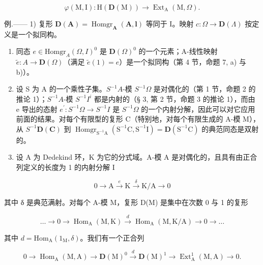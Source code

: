 \[
\varphi (\mathrm{M}, \mathrm{I}): \mathrm{H} (\mathbf {D} (\mathrm{M})) \longrightarrow \operatorname{Ext} _ {\mathrm{A}} (\mathrm{M}, \Omega).
\]

例.—— 1) 复形 \(\mathbf{D}(\mathbf{A}) = \operatorname{Homgr}_{\mathbf{A}}(\mathbf{A},\mathbf{l})\) 等同于 I。映射 \(c:\Omega \to \mathbf{D}(\Lambda)\) 按定义是一个拟同构。

\begin{enumerate}
\def\labelenumi{\arabic{enumi})}
\setcounter{enumi}{1}
\item
  同态 \(e \in \text{Homgr}_A(\Omega, I)^0\) 是 \(\mathbf{D}(\Omega)^0\) 的一个元素；A-线性映射 \(\tilde{e}: A \to \mathbf{D}(\Omega)\)（满足 \(\tilde{e}(1) = e\)）是一个拟同构（第 4 节，命题 7, a) 与 b)）。
\item
  设 S 为 A 的一个乘性子集。\(S^{-1}A\)-模 \(S^{-1}\Omega\) 是对偶化的（第 1 节，命题 2 的推论 1）；\(S^{-1}A\)-模 \(S^{-1}I^{i}\) 都是内射的（§ 3, 第 2 节，命题 3 的推论 1），而由 e 导出的态射 \(e^{\prime}:S^{-1}\Omega\to S^{-1}I\) 是 \(S^{-1}\Omega\) 的一个内射分解，因此可以对它应用前面的结果。对每个有限型的复形 C（特别地，对每个有限生成的 A-模 M），从 \(S^{-1}\mathbf{D}(\mathbf{C})\) 到 \(\operatorname{Homgr}_{\mathrm{S}^{-1}\mathrm{A}}(\mathrm{S}^{-1}\mathrm{C},\mathrm{S}^{-1}\mathrm{I})=\mathbf{D}(\mathrm{S}^{-1}\mathrm{C})\) 的典范同态是双射的。
\item
  设 A 为 Dedekind 环，K 为它的分式域。A-模 A 是对偶化的，且具有由正合列定义的长度为 1 的内射分解 I
\end{enumerate}

\[
0 \to \mathrm{A} \stackrel {e} {\longrightarrow} \mathrm{K} \stackrel {\delta} {\longrightarrow} \mathrm{K/A} \to 0
\]

其中 δ 是典范满射。对每个 A-模 M，复形 D(M) 是集中在次数 0 与 1 的复形

\[
\dots \longrightarrow 0 \longrightarrow \operatorname{Hom} _ {\mathrm{A}} (\mathrm{M}, \mathrm{K}) \stackrel {d} {\longrightarrow} \operatorname{Hom} _ {\mathrm{A}} (\mathrm{M}, \mathrm{K} / \mathrm{A}) \longrightarrow 0 \longrightarrow \dots
\]

其中 \(d = \mathrm{Hom}_{\mathrm{A}}(1_{\mathrm{M}},\delta)\)。我们有一个正合列

\[
0 \to \operatorname{Hom} _ {\mathrm{A}} (\mathrm{M}, \mathrm{A}) \longrightarrow \mathbf {D} (\mathrm{M}) ^ {0} \stackrel {d} {\longrightarrow} \mathbf {D} (\mathrm{M}) ^ {1} \longrightarrow \operatorname{Ext} _ {\mathrm{A}} ^ {1} (\mathrm{M}, \mathrm{A}) \to 0.
\]

